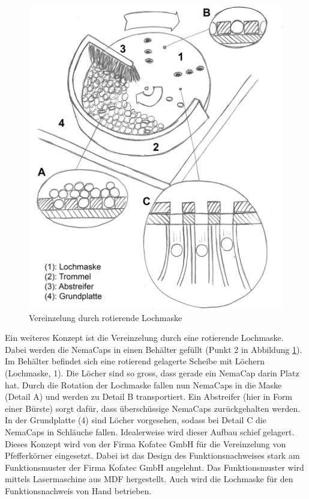\begin{figure}
	\includegraphics[scale=0.52]{Illustrationen/5-Konzept/schema_vereinzelung.jpg}
	\caption{Vereinzelung durch rotierende Lochmaske}
	\label{fig:schema_vereinzelung}
\end{figure}
Ein weiteres Konzept ist die Vereinzelung durch eine rotierende Lochmaske. Dabei werden die NemaCaps in einen Behälter gefüllt (Punkt 2 in Abbildung \ref{fig:schema_vereinzelung}). Im Behälter befindet sich eine rotierend gelagerte Scheibe mit Löchern (Lochmaske, 1). Die Löcher sind so gross, dass gerade ein NemaCap darin Platz hat. Durch die Rotation der Lochmaske fallen nun NemaCaps in die Maske (Detail A) und werden zu Detail B transportiert. Ein Abstreifer (hier in Form einer Bürste) sorgt dafür, dass überschüssige NemaCaps zurückgehalten werden. In der Grundplatte (4) sind Löcher vorgesehen, sodass bei Detail C die NemaCaps in Schläuche fallen. Idealerweise wird dieser Aufbau schief gelagert. 
\newline
\newline
Dieses Konzept wird von der Firma Kofatec GmbH für die Vereinzelung von Pfefferkörner eingesetzt. Dabei ist das Design des Funktionsnachweises stark am Funktionsmuster der Firma Kofatec GmbH angelehnt. Das Funktionsmuster wird mittels Lasermaschine aus MDF hergestellt. Auch wird die Lochmaske für den Funktionsnachweis von Hand betrieben.
